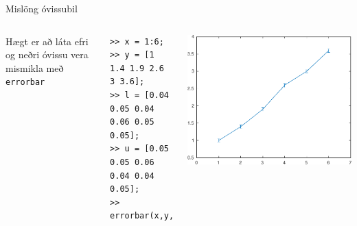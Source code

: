 \documentclass[handout]{beamer}
\begin{document}
\begin{frame}[fragile]{Mislöng óvissubil}
\begin{columns}
Hægt er að láta efri og neðri óvissu vera mismikla með \texttt{errorbar}
\begin{verbatim}
>> x = 1:6;
>> y = [1 1.4 1.9 2.6 3 3.6];
>> l = [0.04 0.05 0.04 0.06 0.05 0.05];
>> u = [0.05 0.05 0.06 0.04 0.04 0.05];
>> errorbar(x,y,l,u)
\end{verbatim}
\includegraphics[width=\textwidth]{Pics/uneven-errorbar}
\end{columns}
\end{frame}
\end{document}
